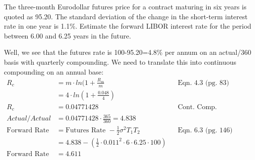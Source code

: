 \documentclass[12pt]{article}
\newenvironment{problem}[3][Problem]{\begin{trivlist}
\item[\hskip \labelsep {\bfseries #1}\hskip \labelsep {\bfseries #2.}]}{\end{trivlist}}
\begin{document}
\begin{problem}{6.21}. The three-month Eurodollar futures price for a contract maturing in six years is quoted as
95.20. The standard deviation of the change in the short-term interest rate in one year is
1.1\%. Estimate the forward LIBOR interest rate for the period between 6.00 and 6.25 years
in the future. 

Well, we see that the futures rate is 100-95.20=4.8\% per annum on an actual/360 basis with quarterly compounding.  We need to translate this into continuous compounding on an annual base:
\begin{align*}
R_c &= m \cdot ln(1+\frac{R_m}{m} && \text{Eqn. 4.3 (pg. 83)} \\
&= 4 \cdot ln(1+\frac{0.048}{4}) \\
R_c &= 0.04771428  && \text{Cont. Comp. Actual/360} \\
Actual/Actual &= 0.04771428 \cdot \frac{365}{360} = 4.838 \\
\text{Forward Rate} &= \text{Futures Rate } - \frac{1}{2}\sigma^2T_1T_2  && \text{Eqn. 6.3 (pg. 146)} \\
&= 4.838 - (\frac{1}{2} \cdot 0.011^2 \cdot 6 \cdot 6.25 \cdot 100)\\ 
\text{Forward Rate} &=  4.611
\end{align*}
\end{problem}
\end{document}
